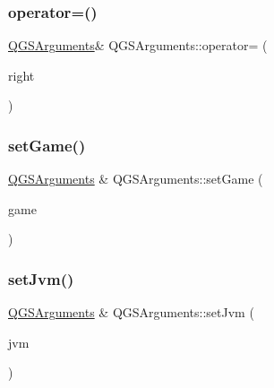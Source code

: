 \mbox{\label{class_q_g_s_arguments_a9156809a63704898b86de5844862b55a}} 
\subsubsection{\texorpdfstring{operator=()}{operator=()}\hspace{0.1cm}{\footnotesize\ttfamily [2/2]}}
{\footnotesize\ttfamily \mbox{\hyperlink{class_q_g_s_arguments}{Q\+G\+S\+Arguments}}\& Q\+G\+S\+Arguments\+::operator= (\begin{DoxyParamCaption}\item[{\mbox{\hyperlink{class_q_g_s_arguments}{Q\+G\+S\+Arguments}} \&\&}]{right }\end{DoxyParamCaption})\hspace{0.3cm}{\ttfamily [default]}}

\mbox{\label{class_q_g_s_arguments_a55d8ebf48ca8923672b99270f1e90081}} 
\subsubsection{\texorpdfstring{set\+Game()}{setGame()}}
{\footnotesize\ttfamily \mbox{\hyperlink{class_q_g_s_arguments}{Q\+G\+S\+Arguments}} \& Q\+G\+S\+Arguments\+::set\+Game (\begin{DoxyParamCaption}\item[{Q\+List$<$ \mbox{\hyperlink{class_q_g_s_arguments_1_1_q_g_s_argument}{Q\+G\+S\+Argument}} $>$}]{game }\end{DoxyParamCaption})}

\mbox{\label{class_q_g_s_arguments_a00448cd21aedcfc36baf36674dfd02cf}} 
\subsubsection{\texorpdfstring{set\+Jvm()}{setJvm()}}
{\footnotesize\ttfamily \mbox{\hyperlink{class_q_g_s_arguments}{Q\+G\+S\+Arguments}} \& Q\+G\+S\+Arguments\+::set\+Jvm (\begin{DoxyParamCaption}\item[{Q\+List$<$ \mbox{\hyperlink{class_q_g_s_arguments_1_1_q_g_s_argument}{Q\+G\+S\+Argument}} $>$}]{jvm }\end{DoxyParamCaption})}



